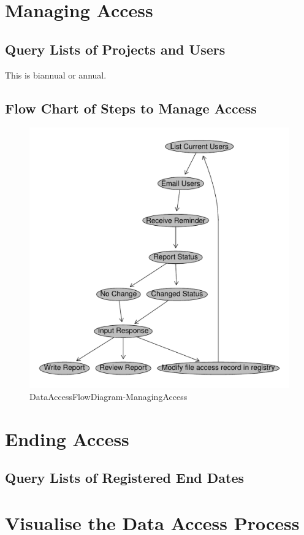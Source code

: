 \documentclass[a4paper]{article}
\begin{document}
\section{Managing Access}
\label{sec-3}
\subsection{Query Lists of Projects and Users}
\label{sec-3-1}

This is biannual or annual.
\subsection{Flow Chart of Steps to Manage Access}
\label{sec-3-2}


\begin{figure}[!h]
\centering
\includegraphics[width=\textwidth]{DataAccessFlowDiagram-ManagingAccess.pdf}
\caption{DataAccessFlowDiagram-ManagingAccess}
\label{fig:DataAccessFlowDiagram-ManagingAccess}
\end{figure}
\clearpage
\section{Ending Access}
\label{sec-4}
\subsection{Query Lists of Registered End Dates}
\label{sec-4-1}
\section{Visualise the Data Access Process}
\label{sec-5}
\end{document}
